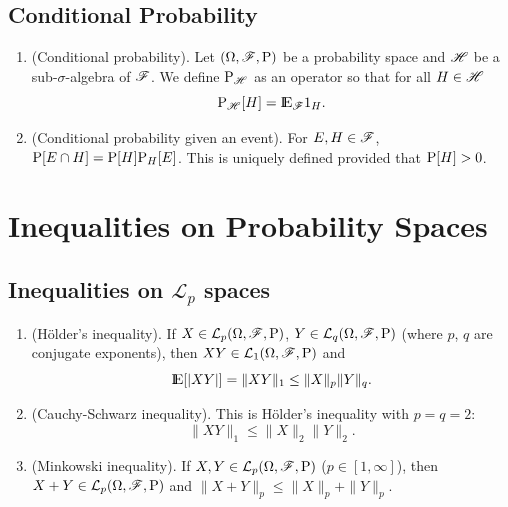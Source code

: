 \documentclass[a4paper,10pt]{article}
\begin{document}
\subsection{Conditional Probability}
\begin{enumerate}
 \item (Conditional probability). Let $(\Omega,\mathscr{F},\mathrm{P})$ be a probability space and $\mathscr{H}$ be a sub-$\sigma$-algebra
       of $\mathscr{F}$. We define $\mathrm{P}_{\mathscr{H}}$ as an operator so that for all $H\in\mathscr{H}$
       \[
        \prob_{\HH}[H] = \E_{\F}1_{H}.
       \]
 \item (Conditional probability given an event). For $E,H\in\mathscr{F}$, $\mathrm{P}[E\cap H] = \mathrm{P}[H]\mathrm{P}_{H}[E]$. This is
       uniquely defined provided that $\mathrm{P}[H]>0$.
\end{enumerate}


\section{Inequalities on Probability Spaces}

\subsection{Inequalities on $\mathcal{L}_p$ spaces}
\begin{enumerate}
  \item (H\"older's inequality). If $X\in\mathcal{L}_p(\Omega,\mathscr{F},\mathrm{P})$, $Y\in\mathcal{L}_q(\Omega,\mathscr{F},\mathrm{P})$ (where $p$, $q$ are conjugate exponents), then $XY\in\mathcal{L}_1(\Omega,\mathscr{F},\mathrm{P})$ and \[ \E[|XY|] = \|XY\|_1 \leq \|X\|_p \|Y\|_q.\]
 
 \item (Cauchy-Schwarz inequality). This is H\"older's inequality with $p=q=2$:
 \[
    \|XY\|_1 \leq \|X\|_2 \|Y\|_2.
 \]

 \item (Minkowski inequality). If $X,Y\in\mathcal{L}_p(\Omega,\mathscr{F},\mathrm{P})$ ($p\in [1,\infty]$), then $X+Y\in\mathcal{L}_p(\Omega,\mathscr{F},\mathrm{P})$  and 
       $\|X+Y\|_p \leq \|X\|_p + \|Y\|_p$.
\end{enumerate}
\end{document}
